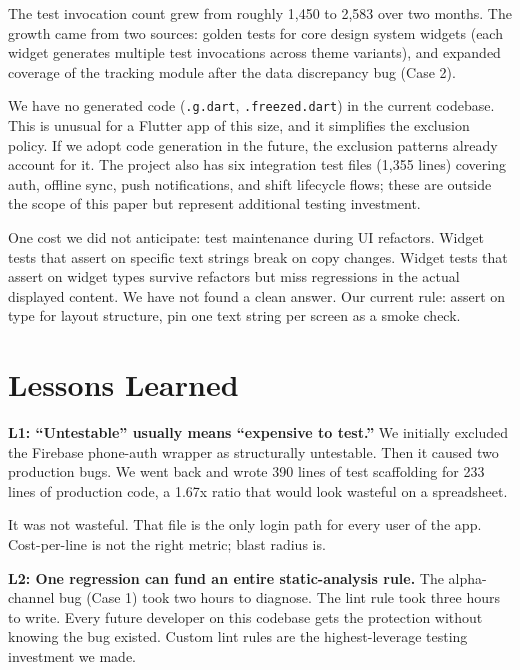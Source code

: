 \documentclass[10pt,journal,compsoc]{IEEEtran}
\begin{document}
The test invocation count grew from roughly 1,450 to 2,583 over two
months. The growth came from two sources: golden tests for core design
system widgets (each widget generates multiple test invocations across
theme variants), and expanded coverage of the tracking module after the
data discrepancy bug (Case 2).

We have no generated code (\texttt{.g.dart}, \texttt{.freezed.dart}) in
the current codebase. This is unusual for a Flutter app of this size, and
it simplifies the exclusion policy. If we adopt code generation in the
future, the exclusion patterns already account for it. The project also
has six integration test files (1,355 lines) covering auth, offline sync,
push notifications, and shift lifecycle flows; these are outside the
scope of this paper but represent additional testing investment.

One cost we did not anticipate: test maintenance during UI refactors.
Widget tests that assert on specific text strings break on copy changes.
Widget tests that assert on widget types survive refactors but miss
regressions in the actual displayed content. We have not found a clean
answer. Our current rule: assert on type for layout structure, pin one
text string per screen as a smoke check.


\section{Lessons Learned}
\label{sec:lessons}

\textbf{L1: ``Untestable'' usually means ``expensive to test.''}
We initially excluded the Firebase phone-auth wrapper as structurally
untestable. Then it caused two production bugs. We went back and wrote
390 lines of test scaffolding for 233 lines of production code, a 1.67x
ratio that would look wasteful on a spreadsheet.

It was not wasteful. That file is the only login path for every user of
the app. Cost-per-line is not the right metric; blast radius is.

\textbf{L2: One regression can fund an entire static-analysis rule.}
The alpha-channel bug (Case 1) took two hours to diagnose. The lint rule
took three hours to write. Every future developer on this codebase gets the
protection without knowing the bug existed. Custom lint rules are the
highest-leverage testing investment we made.
\end{document}

